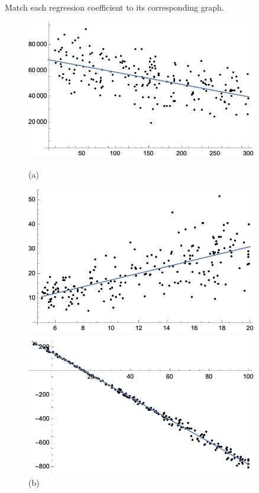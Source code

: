 \documentclass[11pt,letterpaper]{article}
\begin{document}
\newpage



 Match each regression coefficient to its corresponding graph. 
	\begin{figure}[!ht]
	\centering
	\begin{minipage}{0.45\textwidth}
	   \centering
	   \includegraphics[width=0.9\textwidth]{reg1.png}
	   \caption*{(a)}
	\end{minipage}\hfill
	\begin{minipage}{0.45\textwidth}
	   \centering
	   \includegraphics[width=0.9\textwidth]{reg2.png}
	   \caption*{(b)}
	\end{minipage}
	\begin{minipage}{0.45\textwidth}
	   \centering
	   \includegraphics[width=0.9\textwidth]{reg3.png}

\end{minipage}
\end{figure}
\end{document}
